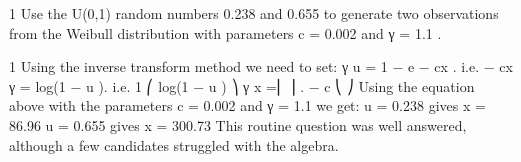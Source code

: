 \documentclass[a4paper,12pt]{article}
\begin{document}
1 Use the U(0,1) random numbers 0.238 and 0.655 to generate two observations from
the Weibull distribution with parameters c = 0.002 and γ = 1.1 .




1
Using the inverse transform method we need to set:
γ
u = 1 − e − cx .
i.e.
− cx γ = log(1 − u ).
i.e.
1
⎛ log(1 − u ) ⎞ γ
x =⎜
⎟ .
− c
⎝
⎠
Using the equation above with the parameters c = 0.002 and γ = 1.1 we get:
u = 0.238 gives x = 86.96
u = 0.655 gives x = 300.73
This routine question was well answered, although a few candidates struggled with the
algebra.
\end{document}

